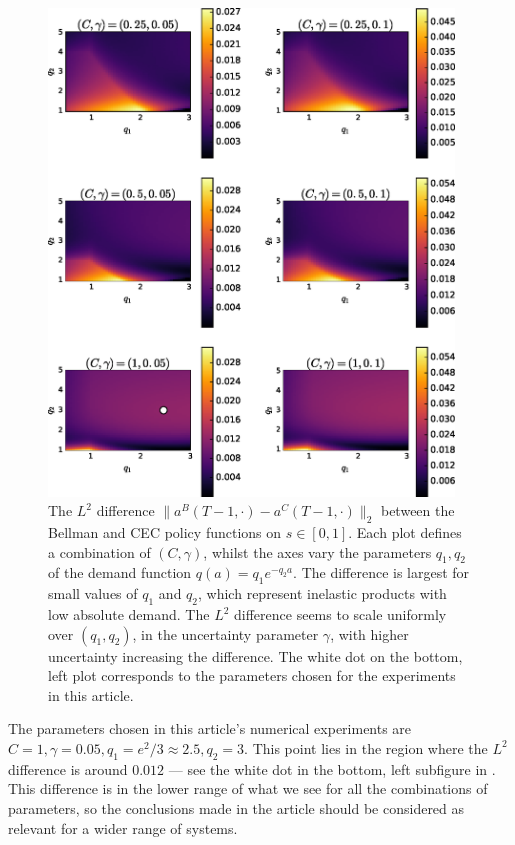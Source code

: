 \documentclass[main.tex]{subfiles}
\begin{document}
\begin{figure}[htbp]
    \includegraphics[width=0.96\textwidth]{./img/policy_diff_heatmaps}
  \caption{The $L^2$ difference $\|a^B(T-1,\cdot)-a^C(T-1,\cdot)\|_2$
    between the Bellman and CEC policy functions on $s\in[0,1]$.
    Each plot defines a combination of $(C,\gamma)$, whilst
    the axes vary the parameters $q_1,q_2$ of the demand function
    $q(a)=q_1e^{-q_2a}$.
    The difference is largest for small values of $q_1$ and $q_2$,
    which represent inelastic products with low absolute demand.
    The $L^2$ difference seems to scale uniformly over $(q_1,q_2)$, in the uncertainty
    parameter $\gamma$, with higher uncertainty increasing the
    difference.
    The white dot on the bottom, left plot corresponds to the
    parameters chosen for the experiments in this article.
  }\label{fig:policy_diff_heatmaps}
\end{figure}

The parameters chosen in this article's numerical experiments
are $C=1,\gamma=0.05,q_1=e^2/3\approx2.5,q_2=3$. This point lies
in the region where the $L^2$ difference is around $0.012$ --- see the
white dot in the
bottom, left subfigure in .
This difference is in the lower range of what we see for all the
combinations of parameters, so the conclusions made in the article
should be considered as relevant for a wider range of systems.

\biblio
\end{document}
